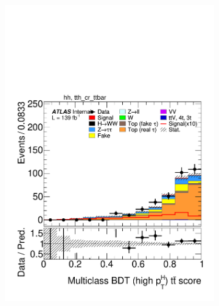 \begin{figure}[h]
\begin{subfigure}[b]{0.32\textwidth}
    \includegraphics[width=\textwidth]{images/sr_cr_plots/plot_tth_ttbar_multiclass_gt200_hh_tth_cr_ttbar.pdf}
    \caption{}
  \end{subfigure}
  \begin{subfigure}[b]{0.32\textwidth}

\end{subfigure}
\end{figure}
